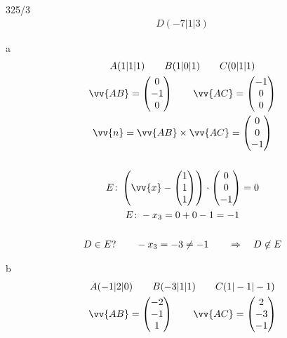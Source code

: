 \begin{exercise}{325/3}
  \begin{gather*}
    D(-7|1|3)
  \end{gather*}
  \item [a]
  \begin{gather*}
    A(1|1|1) \qquad B(1|0|1) \qquad C(0|1|1) \\
    \vv{AB} = \begin{pmatrix}0 \\ -1 \\ 0\end{pmatrix} \qquad \vv{AC} = \begin{pmatrix}-1 \\ 0 \\ 0\end{pmatrix} \\
    \vv{n} = \vv{AB} \times \vv{AC} = \begin{pmatrix}0 \\ 0 \\ -1\end{pmatrix} \\\\
    E \colon \left(\vv{x} - \begin{pmatrix}1 \\ 1 \\ 1\end{pmatrix}\right) \cdot \begin{pmatrix}0 \\ 0 \\ -1\end{pmatrix} = 0 \\
    E \colon -x_3 = 0 + 0 - 1 = -1 \\\\
    D \in E ? \qquad -x_3 = -3 \neq -1 \qquad \Rightarrow\quad D \not\in E
  \end{gather*}
  \item [b]
  \begin{gather*}
    A(-1|2|0) \qquad B(-3|1|1) \qquad C(1|-1|-1) \\
    \vv{AB} = \begin{pmatrix}-2 \\ -1 \\ 1\end{pmatrix} \qquad \vv{AC} = \begin{pmatrix}2 \\ -3 \\ -1\end{pmatrix} \\

\end{gather*}
\end{exercise}
